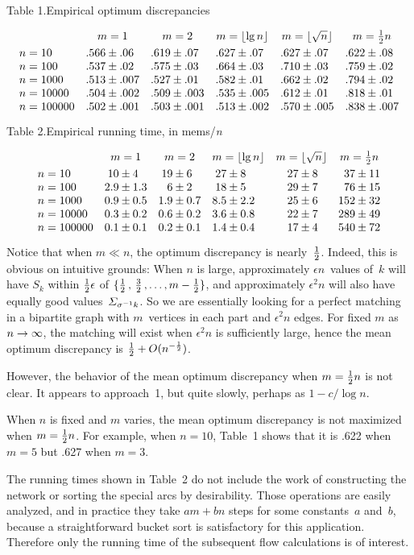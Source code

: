 \vfill\eject
\centerline{Table 1.\quad Empirical optimum discrepancies}
$$\vcenter{\halign{$#$\hfil\quad
&$#$\hfil\quad&$#$\hfil\quad&$#$\hfil\quad&$#$\hfil\quad&$#$\hfil\cr
&\hfil m=1&\hfil m=2&\hfil m=\lfloor\lg n\rfloor&\hfil m=\lfloor\sqrt{n}\rfloor
&\hfil m={1\over 2}n\cr
\noalign{\smallskip}
n=10&.566\pm .06&.619\pm .07&.627\pm .07&.627\pm .07&.622\pm .08\cr
n=100&.537\pm .02&.575\pm .03&.664\pm .03&.710\pm .03&.759\pm .02\cr
n=1000&.513\pm .007&.527\pm.01&.582\pm.01&.662\pm.02&.794\pm.02\cr
n=10000&.504\pm.002&.509\pm.003&.535\pm.005&.612\pm.01&.818\pm.01\cr
n=100000&.502\pm.001&.503\pm.001&.513\pm.002&.570\pm.005&.838\pm.007\cr
}}$$

\bigskip
\centerline{Table 2.\quad Empirical running time, in mems/{\it n}}
$$\vcenter{\halign{$#$\hfil\quad
&$#$\hfil\quad&$#$\hfil\quad&$#$\hfil\quad&$#$\hfil\quad&$#$\hfil\cr
&\hfil m=1&\hfil m=2&\hfil m=\lfloor\lg n\rfloor&m=\lfloor\sqrt{n}\rfloor
&\hfil m={1\over 2}n\cr
\noalign{\smallskip}
n=10&\phantom{.}10\pm 4&\phantom{.}19\pm 6&\phantom{.}27\pm 8&\quad 27\pm 8%
&\phantom{1}37\pm 11\cr
n=100&2.9\pm 1.3&\phantom{1.}6\pm 2&\phantom{.}18\pm 5%
&\quad 29\pm 7&\phantom{1}76\pm 15\cr
n=1000&0.9\pm 0.5&1.9\pm 0.7&8.5\pm 2.2&\quad 25\pm 6&152\pm 32\cr
n=10000&0.3\pm 0.2&0.6\pm 0.2&3.6\pm 0.8&\quad 22\pm 7&289\pm 49\cr
n=100000&0.1\pm 0.1&0.2\pm 0.1&1.4\pm 0.4&\quad 17\pm 4&540\pm 72\cr
}}$$

Notice that when $m\ll n$, the optimum discrepancy is nearly~${1\over 2}$.
Indeed, this is obvious on intuitive grounds: When $n$ is large, approximately
$\epsilon n$~values of~$k$ will have $S_k$ within ${1\over 2}\epsilon$ of
$\{{1\over 2}\,,\,{3\over 2}\,,\ldots,m-{1\over 2}\}$, and approximately
$\epsilon^2n$ will also have equally good values~${\mit\Sigma}_{\sigma^{-1}k}$.
So we are essentially looking for a perfect matching in a bipartite graph with
$m$~vertices in each part and $\epsilon^2n$ edges. For fixed $m$ as $n\rightarrow
\infty$, the matching will exist when $\epsilon^2n$ is sufficiently large,
hence the mean optimum discrepancy is ${1\over 2}+O(n^{-{1\over 2}})$.

However, the behavior of the mean optimum discrepancy when $m={1\over 2}n$ is
not clear. It appears to approach~1, but quite slowly, perhaps as $1-c/\log n$.

When $n$ is fixed and $m$ varies, the mean optimum discrepancy is not maximized
when $m={1\over 2}n$.  For example, when $n=10$, Table~1 shows that it is .622
when $m=5$ but .627 when $m=3$. 

The running times shown in Table~2 do not include the work of constructing the
network or sorting the special arcs by desirability. Those operations are
easily analyzed, and in practice they take $am+bn$ steps for some constants~$a$
and~$b$, because a straightforward bucket sort is satisfactory for this
application. Therefore only the running time of the subsequent flow
calculations is of interest.

